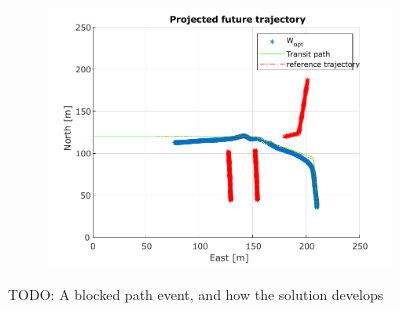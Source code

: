\begin{figure}
\begin{subfigure}[b]{0.61\textwidth}
    \end{subfigure}
    \hfill
    \begin{subfigure}[b]{0.61\textwidth}
        \centering
        \includegraphics[width=\textwidth]{images/Completely_blocked_wopt_next.pdf}
    \end{subfigure}
    \caption{TODO: A blocked path event, and how the solution develops}
\end{figure}



